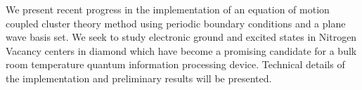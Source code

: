 We present recent progress in the implementation of an equation of motion
coupled cluster theory method using periodic boundary conditions and a plane
wave basis set.  We seek to study electronic ground and excited states in
Nitrogen Vacancy centers in diamond which have become a promising candidate for
a bulk room temperature quantum information processing device. Technical details
of the implementation and preliminary results will be presented.


